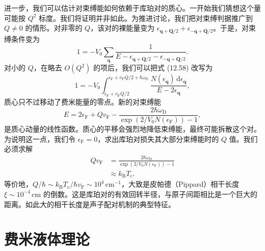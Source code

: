 进一步，我们可以估计对束缚能如何依赖于库珀对的质心。一开始我们猜想这个量可能按 $Q^{2}$ 标度。我们将证明并非如此。为推进讨论，我们把对束缚判据推广到 $Q\neq 0$ 的情形。对非零的 $Q$，该对的裸能量变为 $\epsilon_{\mathbf{q}+\mathbf{Q}/2}+\epsilon_{-\mathbf{q}+\mathbf{Q}/2}$。于是，对束缚条件变为
\begin{equation*}
1=-V_{0}\sum_{\mathbf{q}}\frac{1}{E-\epsilon_{\mathbf{q}+\mathbf{Q}/2}-\epsilon_{-\mathbf{q}+\mathbf{Q}/2}}.\tag{12.58}
\end{equation*}
对小的 $Q$，在略去 $O(Q^{2})$ 的项后，我们可以把式 (12.58) 改写为
\begin{equation*}
1=-V_{0}\int_{\epsilon_{\mathrm{F}}+v_{\mathrm{F}}Q/2}^{\epsilon_{\mathrm{F}}+v_{\mathrm{F}}Q/2+\hbar\omega_{\mathrm{D}}}\frac{N(\epsilon_{\mathbf{q}})\,\mathrm{d}\epsilon_{\mathbf{q}}}{E-2\epsilon_{\mathbf{q}}},\tag{12.59}
\end{equation*}
质心只不过移动了费米能量的零点。新的对束缚能
\begin{equation*}
E=2\epsilon_{\mathrm{F}}+Qv_{\mathrm{F}}-\frac{2\hbar\omega_{\mathrm{D}}}{\exp\left(2/V_{0}N(\epsilon_{\mathrm{F}})\right)-1},\tag{12.60}
\end{equation*}
是质心动量的线性函数。质心的平移会强烈地降低束缚能，最终可能拆散这个对。为说明这一点，我们令 $\epsilon_{\mathrm{F}}=0$，求出库珀对损失其大部分束缚能时的 $Q$ 值。我们必须求解
\begin{align*}
Qv_{\mathrm{F}}&=\frac{2\hbar\omega_{\mathrm{D}}}{\exp\left(2/V_{0}N(\epsilon_{\mathrm{F}})\right)-1}\\
&\approx k_{\mathrm{B}}T_{\mathrm{c}}.\tag{12.61}
\end{align*}
等价地，$Q/\hbar\sim k_{\mathrm{B}}T_{\mathrm{c}}/\hbar v_{\mathrm{F}}\sim 10^{4}\,\mathrm{cm}^{-1}$，大致是皮帕德（Pippard）相干长度 $\xi\sim 10^{-4}\,\mathrm{cm}$ 的倒数。这是库珀对的有效回转半径，与原子间距相比是一个巨大的距离。如此大的相干长度是声子配对机制的典型特征。

\section{费米液体理论}

